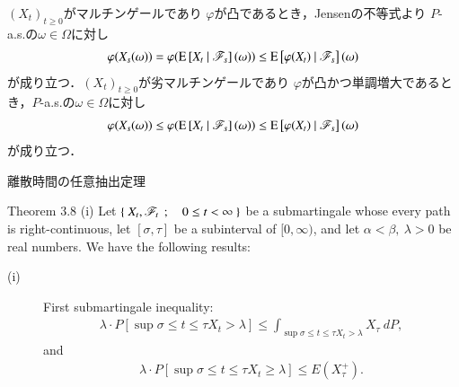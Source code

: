 	\begin{prf}
		$(X_t)_{t \geq 0}$がマルチンゲールであり
		$\varphi$が凸であるとき，Jensenの不等式より
		$P$-a.s.の$\omega \in \Omega$に対し
		\begin{align}
			\varphi(X_s(\omega))
			= \varphi(\operatorname{E} \left[ X_t \ \middle|\ \mathscr{F}_s \right](\omega))
			\leq \operatorname{E} \left[ \varphi(X_t) \ \middle|\ \mathscr{F}_s \right](\omega)
		\end{align}
		が成り立つ．$(X_t)_{t \geq 0}$が劣マルチンゲールであり
		$\varphi$が凸かつ単調増大であるとき，$P$-a.s.の$\omega \in \Omega$に対し
		\begin{align}
			\varphi(X_s(\omega))
			\leq \varphi(\operatorname{E} \left[ X_t \ \middle|\ \mathscr{F}_s \right](\omega))
			\leq \operatorname{E} \left[ \varphi(X_t) \ \middle|\ \mathscr{F}_s \right](\omega)
		\end{align}
		が成り立つ．
		\QED
	\end{prf}
	
	\begin{itembox}[l]{離散時間の任意抽出定理}
	\end{itembox}
	
	\begin{itembox}[l]{Theorem 3.8 (i)}
		Let $\left\{\ X_t,\mathscr{F}_t\ \, ; \quad 0 \leq t < \infty\ \right\}$ be a submartingale 
		whose every path is right-continuous, let $[\sigma, \tau]$ be a subinterval of 
		$[0,\infty)$, and let $\alpha < \beta,\ \lambda > 0$ be real numbers. We have the 
		following results:
		\begin{description}
			\item[(i)] First submartingale inequality:
				\begin{align}
					\lambda \cdot P\left[ \sup{\sigma \leq t \leq \tau}{X_t} > \lambda \right]
					\leq \int_{\displaystyle\sup{\sigma \leq t \leq \tau}{X_t} > \lambda} X_\tau\ dP,
					\label{eq:chapter_1_Theorem_3_8_i_1}
				\end{align}
				and
				\begin{align}
					\lambda \cdot P\left[ \sup{\sigma \leq t \leq \tau}{X_t} \geq \lambda \right]
					\leq E(X^+_\tau).
				\end{align}
		\end{description}
	\end{itembox}
	
